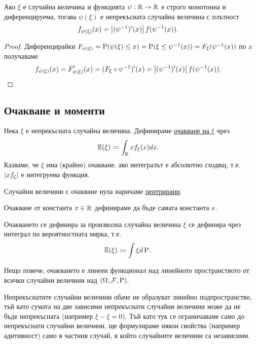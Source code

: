 \documentclass[numbers=endperiod, DIV=15, bibliography=totocnumbered]{scrartcl}
\begin{document}
\begin{proposition}\label{thm:transformation-density}
  Ако $\xi$ е случайна величина и функцията $\psi: \mathbb{R} \to \mathbb{R}$ е строго монотонна и диференцируема, тогава $\psi(\xi)$ е непрекъсната случайна величина с плътност
  \begin{displaymath}
    f_{\psi(\xi)} (x)
    =
    \left\vert (\psi^{-1})'(x) \right\vert f(\psi^{-1}(x)).
  \end{displaymath}
\end{proposition}
\begin{proof} Диференцирайки $F_{\psi(\xi)} = \operatorname{P}(\psi(\xi) \leq x) = \operatorname{P}(\xi \leq \psi^{-1}(x)) = F_\xi(\psi^{-1}(x))$ по $x$ получаваме
  \begin{displaymath}
    f_{\psi(\xi)} (x)
    =
    F'_{\psi(\xi)} (x)
    =
    (F_{\xi} \circ \psi^{-1})'(x)
    =
    \left\vert (\psi^{-1})'(x) \right\vert f(\psi^{-1}(x)).
  \end{displaymath}
\end{proof}

\subsection{Очакване и моменти}

\begin{definition}
  Нека $\xi$ е непрекъсната случайна величина. Дефинираме \uline{очакване на $\xi$} чрез
  \begin{displaymath}
    \mathbb{E}(\xi) \coloneqq \int_{\mathbb{R}} x f_\xi(x) dx.
  \end{displaymath}
  Казваме, че $\xi$ има (крайно) очакване, ако интегралът е абсолютно сходящ, т.е. $\left\vert x f_\xi \right\vert$ е интегруема функция.

  Случайни величини с очакване нула наричаме \uline{центрирани}.

  Очакване от константа $x \in \mathbb{R}$ дефинираме да бъде самата константа $x$.
\end{definition}

\begin{note}
  Очакването се дефинира за произволна случайна величина $\xi$ се дефинира чрез интеграл по вероятностната мярка, т.е.
  \begin{displaymath}
    \mathbb{E}(\xi) \coloneqq \int \xi d\operatorname{P}.
  \end{displaymath}

  Нещо повече, очакването е линеен функционал над линейното пространството от всички случайни величини над $(\Omega, \mathcal{F}, \operatorname{P})$.

  Непрекъснатите случайни величини обаче не образуват линейно подпространство, тъй като сумата на две зависими непрекъснати случайни величини може да не бъде непрекъсната (например $\xi - \xi = 0$). Тъй като тук се ограничаваме само до непрекъснати случайни величини, ще формулираме някои свойства (например адитивност) само в частния случай, в който случайните величини са независими.
\end{note}
\end{document}
